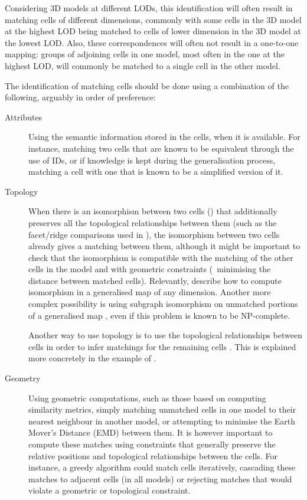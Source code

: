 Considering 3D models at different LODs, this identification will often result in matching cells of different dimensions, commonly with some cells in the 3D model at the highest LOD being matched to cells of lower dimension in the 3D model at the lowest LOD\@.
Also, these correspondences will often not result in a one-to-one mapping: groups of adjoining cells in one model, most often in the one at the highest LOD, will commonly be matched to a single cell in the other model.

The identification of matching cells should be done using a combination of the following, arguably in order of preference:

\begin{description}
\item[Attributes]
Using the semantic information stored in the cells, when it is available.
For instance, matching two cells that are known to be equivalent through the use of IDs, or if knowledge is kept during the generalisation process, matching a cell with one that is known to be a simplified version of it.

\item[Topology]
When there is an isomorphism between two cells () that additionally preserves all the topological relationships between them (such as the facet/ridge comparisons used in ), the isomorphism between two cells already gives a matching between them, although it might be important to check that the isomorphism is compatible with the matching of the other cells in the model and with geometric constraints (\eg\ minimising the distance between matched cells).
Relevantly, \citet{Gosselin11} describe how to compute isomorphism in a generalised map of any dimension.
Another more complex possibility is using subgraph isomorphism on unmatched portions of a generalised map \citep{Eppstein99}, even if this problem is known to be NP-complete.

Another way to use topology is to use the topological relationships between cells in order to infer matchings for the remaining cells \citep{Hampe03}.
This is explained more concretely in the example of .

\item[Geometry]
Using geometric computations, such as those based on computing similarity metrics, simply matching unmatched cells in one model to their nearest neighbour in another model, or attempting to minimise the Earth Mover's Distance (EMD) \citep{Rubner98} between them.
It is however important to compute these matches using constraints that generally preserve the relative positions and topological relationships between the cells.
For instance, a greedy algorithm could match cells iteratively, cascading these matches to adjacent cells (in all models) or rejecting matches that would violate a geometric or topological constraint.
\end{description}

